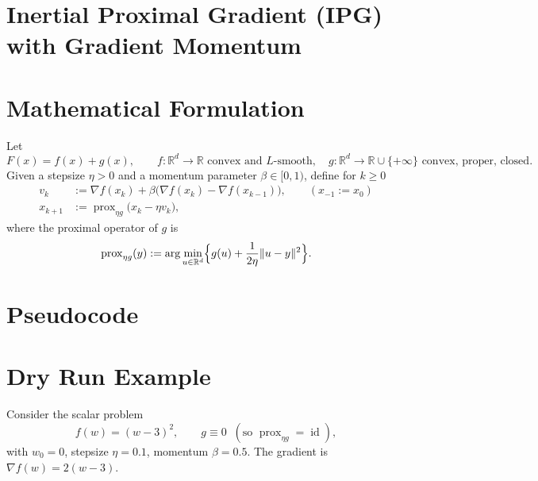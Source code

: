 \documentclass{article}
\newcommand{\prox}{\operatorname{prox}}
\newcommand{\R}{\mathbb{R}}
\begin{document}
\section*{Inertial Proximal Gradient (IPG) with Gradient Momentum}

\section*{Mathematical Formulation}
Let 
\[
F(x)=f(x)+g(x),\qquad f:\R^{d}\rightarrow\R \text{ convex and } L\text{-smooth},\quad 
g:\R^{d}\rightarrow\R\cup\{+\infty\}\text{ convex, proper, closed}.
\]
Given a stepsize $\eta>0$ and a momentum parameter $\beta\in[0,1)$, define for $k\ge 0$
\[
\begin{aligned}
v_k &:= \nabla f(x_k)+\beta\bigl(\nabla f(x_k)-\nabla f(x_{k-1})\bigr),\qquad (x_{-1}:=x_0)\\[0.3em]
x_{k+1}&:=\prox_{\eta g}\bigl(x_k-\eta v_k\bigr),
\end{aligned}
\tag{IPG}
\]
where the proximal operator of $g$ is
\[
\prox_{\eta g}(y):=\arg\min_{u\in\R^{d}}\Bigl\{g(u)+\frac{1}{2\eta}\|u-y\|^{2}\Bigr\}.
\]

\section*{Pseudocode}
\begin{algorithm}[H]
\caption{Inertial Proximal Gradient (IPG)}
\begin{algorithmic}[1]
\STATE \textbf{Input:} stepsize $\eta>0$, momentum $\beta\in[0,1)$, max iter $T$.
\STATE Initialize $x_{0}\in\R^{d}$, set $x_{-1}=x_{0}$.
    \STATE Compute gradients 
    \[
    g_k:=\nabla f(x_k),\qquad 
    g_{k-1}:=\nabla f(x_{k-1})\;(k=0\Rightarrow g_{-1}=g_{0}).
    \]
    \STATE Form the inertial gradient 
    \[
    v_k:=g_k+\beta\,(g_k-g_{k-1}). \tag{Step 5}
    \]
    \STATE Proximal update 
    \[
    x_{k+1}:=\prox_{\eta g}\bigl(x_k-\eta v_k\bigr). \tag{Step 6}
\ENDFOR
\STATE \textbf{Output:} $x_T$ (or the best iterate).
\end{algorithmic}
\end{algorithm}

\section*{Dry Run Example}
Consider the scalar problem 
\[
f(w)=(w-3)^{2},\qquad g\equiv0\;\;(\text{so }\prox_{\eta g}= \operatorname{id}),
\]
with $w_{0}=0$, stepsize $\eta=0.1$, momentum $\beta=0.5$.
The gradient is $\nabla f(w)=2(w-3)$.
\end{document}
